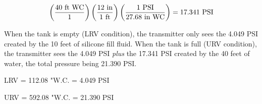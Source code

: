 $$\left(40 \hbox{ ft WC} \over 1 \right) \left(12 \hbox{ in} \over 1 \hbox{ ft} \right) \left(1 \hbox{ PSI} \over 27.68 \hbox{ in WC} \right) = 17.341 \hbox{ PSI}$$

\vskip 10pt

When the tank is empty (LRV condition), the transmitter only sees the 4.049 PSI created by the 10 feet of silicone fill fluid.  When the tank is full (URV condition), the transmitter sees the 4.049 PSI {\it plus} the 17.341 PSI created by the 40 feet of water, the total pressure being 21.390 PSI.

\vskip 10pt

LRV = 112.08 "W.C. = 4.049 PSI

\vskip 10pt

URV = 592.08 "W.C. = 21.390 PSI





